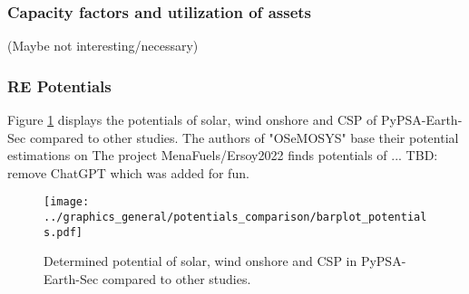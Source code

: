 \subsubsection{Capacity factors and utilization of assets}
(Maybe not interesting/necessary)


\subsubsection{RE Potentials}
Figure \ref{fig:potentials} displays the potentials of solar, wind onshore and CSP 
of PyPSA-Earth-Sec compared to other studies. The authors of "OSeMOSYS" 
\cite{Cannone2021} base their potential estimations on \cite[primary: 13,18,19]{Cannone2021}
The project MenaFuels/Ersoy2022 \cite{Ersoy2022} finds potentials of ...
TBD: remove ChatGPT which was added for fun.

\begin{figure}[h!]
    \centering
    \texttt{[image: ../graphics\_general/potentials\_comparison/barplot\_potentials.pdf]}
    \caption{Determined potential of solar, wind onshore and CSP in PyPSA-Earth-Sec compared to other studies.}
    \label{fig:potentials}
\end{figure}